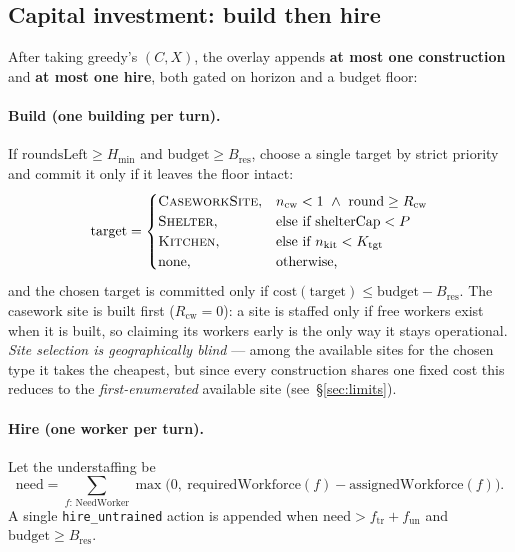 \documentclass[11pt]{article}
\newcommand{\unity}[1]{{\color{unityblue}\texttt{\small #1}}}
\begin{document}
\subsection{Capital investment: build then hire}
After taking greedy's $(C,X)$, the overlay appends \textbf{at most one construction} and
\textbf{at most one hire}, both gated on horizon and a budget floor:

\paragraph{Build (one building per turn).} If $\text{roundsLeft} \ge H_{\min}$ and
$\text{budget} \ge B_{\mathrm{res}}$, choose a single target by strict priority and commit it only
if it leaves the floor intact:
\begin{equation}
\text{target} =
\begin{cases}
\textsc{CaseworkSite}, & n_{\text{cw}} < 1 \ \wedge\ \text{round} \ge R_{\text{cw}}\\
\textsc{Shelter}, & \text{else if } \text{shelterCap} < P\\
\textsc{Kitchen}, & \text{else if } n_{\text{kit}} < K_{\text{tgt}}\\
\text{none}, & \text{otherwise,}
\end{cases}
\end{equation}
and the chosen target is committed only if $\mathrm{cost}(\text{target}) \le \text{budget} - B_{\mathrm{res}}$.
The casework site is built first ($R_{\text{cw}}=0$): a site is staffed only if free workers exist
when it is built, so claiming its workers early is the only way it stays operational. \emph{Site
selection is geographically blind} --- among the available sites for the chosen type it takes the
cheapest, but since every construction shares one fixed cost this reduces to the
\emph{first-enumerated} available site (see~\S\ref{sec:limits}).

\paragraph{Hire (one worker per turn).} Let the understaffing be
\begin{equation}
\text{need} = \sum_{f:\,\text{NeedWorker}} \max\big(0,\ \text{requiredWorkforce}(f) - \text{assignedWorkforce}(f)\big).
\end{equation}
A single \unity{hire\_untrained} action is appended when $\text{need} > f_{\mathrm{tr}} +
f_{\mathrm{un}}$ and $\text{budget} \ge B_{\mathrm{res}}$.
\end{document}
